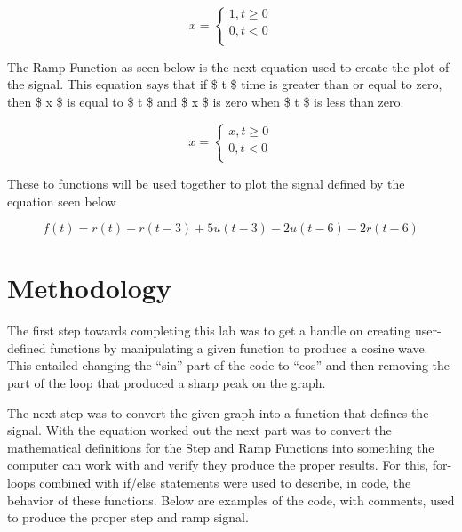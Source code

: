 \documentclass[11pt]{article}
\begin{document}
\[ x =   \left\{
\begin{array}{ll}
      1 , t \geq 0 \\
      0 , t < 0 \\
\end{array} 
\right. \]

The Ramp Function as seen below is the next equation used to create the
plot of the signal. This equation says that if \$ t \$ time is greater
than or equal to zero, then \$ x \$ is equal to \$ t \$ and \$ x \$ is
zero when \$ t \$ is less than zero.

\[ x =   \left\{
\begin{array}{ll}
      x , t \geq 0 \\
      0 , t < 0 \\
\end{array} 
\right. \]

These to functions will be used together to plot the signal defined by
the equation seen below

\[ f(t)=r(t)-r(t-3)+5u(t-3)-2u(t-6)-2r(t-6) \]

    \hypertarget{methodology}{%
\section{Methodology}\label{methodology}}

The first step towards completing this lab was to get a handle on
creating user-defined functions by manipulating a given function to
produce a cosine wave. This entailed changing the ``sin'' part of the
code to ``cos'' and then removing the part of the loop that produced a
sharp peak on the graph.

The next step was to convert the given graph into a function that
defines the signal. With the equation worked out the next part was to
convert the mathematical definitions for the Step and Ramp Functions
into something the computer can work with and verify they produce the
proper results. For this, for-loops combined with if/else statements
were used to describe, in code, the behavior of these functions. Below
are examples of the code, with comments, used to produce the proper step
and ramp signal.
\end{document}
